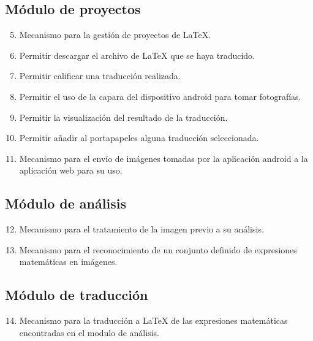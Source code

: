     \subsection{Módulo de proyectos}
    \begin{enumerate}[label=RF\arabic*.]
    	\setcounter{enumi}{4}
    	\item Mecanismo para la gestión de proyectos de \LaTeX{}.
    	\item Permitir descargar el archivo de \LaTeX{} que se haya traducido.
    	\item Permitir calificar una traducción realizada.
    	\item Permitir el uso de la capara del dispositivo android para tomar fotografías.
    	\item Permitir la visualización del resultado de la traducción.
    	\item Permitir añadir al portapapeles alguna traducción seleccionada.
    	\item Mecanismo para el envío de imágenes tomadas por la aplicación android a la aplicación web para su uso.
    \end{enumerate}
    
    \subsection{Módulo de análisis}
    \begin{enumerate}[label=RF\arabic*.]
    	\setcounter{enumi}{11}
    	\item Mecanismo para el tratamiento de la imagen previo a su análisis.
    	\item Mecanismo para el reconocimiento de un conjunto definido de expresiones matemáticas en imágenes.
    \end{enumerate}
    
    \subsection{Módulo de traducción}
    \begin{enumerate}[label=RF\arabic*.]
    	\setcounter{enumi}{13}
    	\item Mecanismo para la traducción a \LaTeX{} de las expresiones matemáticas encontradas en el modulo de análisis.
    \end{enumerate}
    
